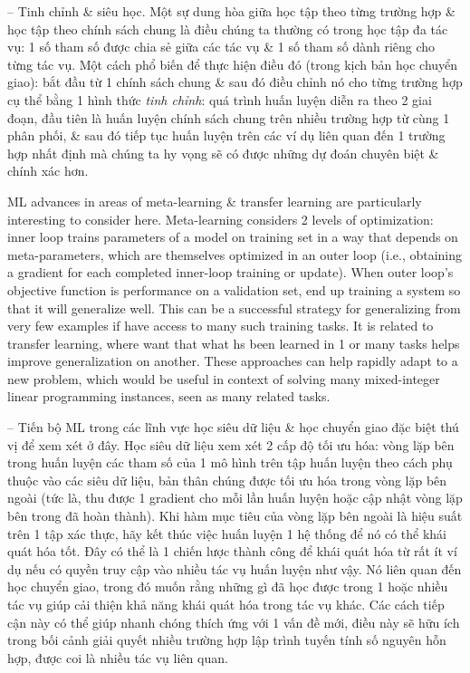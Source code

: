 \documentclass{article}
\begin{document}
\begin{itemize}
\begin{itemize}
        -- {\sf Tinh chỉnh \& siêu học.} Một sự dung hòa giữa học tập theo từng trường hợp \& học tập theo chính sách chung là điều chúng ta thường có trong học tập đa tác vụ: 1 số tham số được chia sẻ giữa các tác vụ \& 1 số tham số dành riêng cho từng tác vụ. Một cách phổ biến để thực hiện điều đó (trong kịch bản học chuyển giao): bắt đầu từ 1 chính sách chung \& sau đó điều chỉnh nó cho từng trường hợp cụ thể bằng 1 hình thức {\it tinh chỉnh}: quá trình huấn luyện diễn ra theo 2 giai đoạn, đầu tiên là huấn luyện chính sách chung trên nhiều trường hợp từ cùng 1 phân phối, \& sau đó tiếp tục huấn luyện trên các ví dụ liên quan đến 1 trường hợp nhất định mà chúng ta hy vọng sẽ có được những dự đoán chuyên biệt \& chính xác hơn.

        ML advances in areas of meta-learning \& transfer learning are particularly interesting to consider here. Meta-learning considers 2 levels of optimization: inner loop trains parameters of a model on training set in a way that depends on meta-parameters, which are themselves optimized in an outer loop (i.e., obtaining a gradient for each completed inner-loop training or update). When outer loop's objective function is performance on a validation set, end up training a system so that it will generalize well. This can be a successful strategy for generalizing from very few examples if have access to many such training tasks. It is related to transfer learning, where want that what hs been learned in 1 or many tasks helps improve generalization on another. These approaches can help rapidly adapt to a new problem, which would be useful in context of solving many mixed-integer linear programming instances, seen as many related tasks.

        -- Tiến bộ ML trong các lĩnh vực học siêu dữ liệu \& học chuyển giao đặc biệt thú vị để xem xét ở đây. Học siêu dữ liệu xem xét 2 cấp độ tối ưu hóa: vòng lặp bên trong huấn luyện các tham số của 1 mô hình trên tập huấn luyện theo cách phụ thuộc vào các siêu dữ liệu, bản thân chúng được tối ưu hóa trong vòng lặp bên ngoài (tức là, thu được 1 gradient cho mỗi lần huấn luyện hoặc cập nhật vòng lặp bên trong đã hoàn thành). Khi hàm mục tiêu của vòng lặp bên ngoài là hiệu suất trên 1 tập xác thực, hãy kết thúc việc huấn luyện 1 hệ thống để nó có thể khái quát hóa tốt. Đây có thể là 1 chiến lược thành công để khái quát hóa từ rất ít ví dụ nếu có quyền truy cập vào nhiều tác vụ huấn luyện như vậy. Nó liên quan đến học chuyển giao, trong đó muốn rằng những gì đã học được trong 1 hoặc nhiều tác vụ giúp cải thiện khả năng khái quát hóa trong tác vụ khác. Các cách tiếp cận này có thể giúp nhanh chóng thích ứng với 1 vấn đề mới, điều này sẽ hữu ích trong bối cảnh giải quyết nhiều trường hợp lập trình tuyến tính số nguyên hỗn hợp, được coi là nhiều tác vụ liên quan.


\end{itemize}
\end{itemize}
\end{document}
